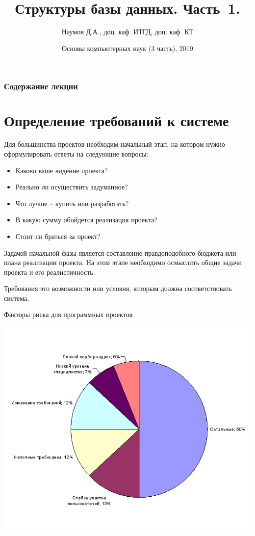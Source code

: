 \documentclass{beamer}
\title[СУБД]{Структуры базы данных. Часть~1. }
\author{Наумов Д.А., доц. каф. ИТГД, доц. каф. КТ}
\date[01.03.2019] {Основы компьютерных наук (3 часть), 2019}
\begin{document}
\begin{frame}
  \titlepage
\end{frame}
  
\begin{frame}
  \frametitle{Содержание лекции}
  \tableofcontents  
\end{frame}
  
\section{Определение требований к системе}
\begin{frame}
Для большинства проектов необходим начальный этап, на котором нужно сформулировать ответы на следующие вопросы:
\begin{itemize}
\item Каково ваше видение проекта?
\item Реально ли осуществить задуманное?
\item Что лучше – купить или разработать?
\item В какую сумму обойдется реализация проекта?
\item Стоит ли браться за проект?
\end{itemize}
Задачей начальной фазы является составление правдоподобного бюджета или плана реализации проекта. На этом этапе необходимо осмыслить общие задачи проекта и его реалистичность. 
\end{frame} 

\begin{frame}
\begin{block}{Требования }
это возможности или условия, которым должна соответствовать система. 
\end{block}
\begin{block}{Факторы риска для программных проектов}
\begin{center}
\includegraphics[scale=0.5]{images/risk.png}
\end{center}
\end{block}
\end{frame} 
\end{document}
